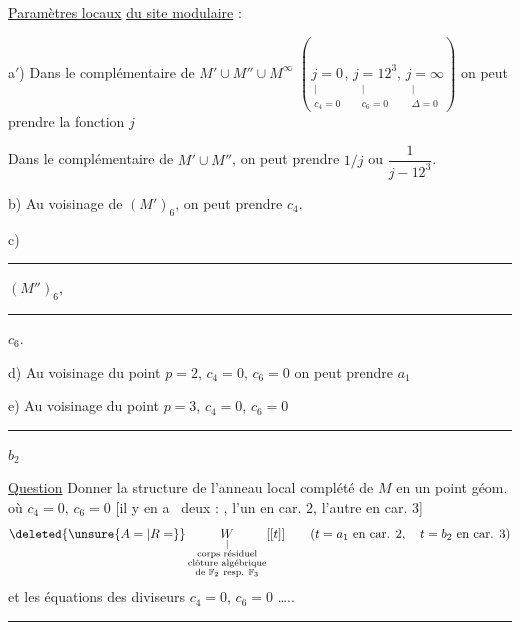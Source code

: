 
\uline{Paramètres locaux} \uline{du site modulaire} :

a$'$) Dans le complémentaire de $M'\cup M''\cup M^\infty$ $\left(\underset{\substack{|\\c_4=0}}{j=0},\,\underset{\substack{|\\c_6=0}}{j=12^3},\,\underset{\substack{|\\\Delta=0}}{j=\infty}\right)$   on peut prendre la fonction $j$

 Dans le complémentaire de $M'\cup M''$, on peut prendre $1/j$ ou $\dfrac{1}{j-12^3}$.


b) Au voisinage de $(M')_6$, on peut prendre $c_4$.

c) \rule{4em}{.3pt} $(M'')_6$, \rule{4em}{.3pt} $c_6$.

d) Au voisinage du point $p=2$, $c_4=0$, $c_6=0$ on peut prendre $a_1$

e) Au voisinage du point $p=3$, $c_4=0$, $c_6=0$ \rule{4em}{.3pt} $b_2$

\uline{Question} Donner la structure de l'anneau local complété de $M$ en un point géom. où $c_4=0$, $c_6=0$ [il y en a \deleted{\unsure{essentiellement}]}\ deux :  , l'un en car. $2$, l'autre en car. $3$]
\[
\deleted{\unsure{A=|R=}}\,\underset{\substack{|\\\text{corps résiduel}\\\text{clôture algébrique}\\\text{de }\mathbb F_2\ \text{resp. }\mathbb F_3}}{W}[[t]]
\qquad (t=a_1\ \text{en car. }2,\quad t=b_2\ \text{en car. }3)
\]
et les équations des diviseurs $c_4=0$, $c_6=0$ \ldots..

\noindent\rule{\linewidth}{.3pt}


